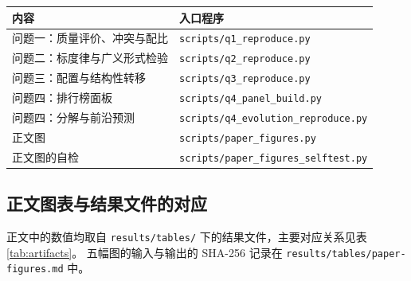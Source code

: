 \begin{center}
  \begin{minipage}{\textwidth}
  \centering
  \label{tab:repro}
  \begin{tabular}{ll}
    \toprule
    内容 & 入口程序 \\
    \midrule
    问题一：质量评价、冲突与配比 & \texttt{scripts/q1\_reproduce.py} \\
    问题二：标度律与广义形式检验 & \texttt{scripts/q2\_reproduce.py} \\
    问题三：配置与结构性转移 & \texttt{scripts/q3\_reproduce.py} \\
    问题四：排行榜面板 & \texttt{scripts/q4\_panel\_build.py} \\
    问题四：分解与前沿预测 & \texttt{scripts/q4\_evolution\_reproduce.py} \\
    正文图 & \texttt{scripts/paper\_figures.py} \\
    正文图的自检 & \texttt{scripts/paper\_figures\_selftest.py} \\
    \bottomrule
  \end{tabular}
  \end{minipage}
\end{center}

\subsection{正文图表与结果文件的对应}

正文中的数值均取自 \texttt{results/tables/} 下的结果文件，主要对应关系见表\ref{tab:artifacts}。
五幅图的输入与输出的 SHA-256 记录在 \texttt{results/tables/paper-figures.md} 中。

